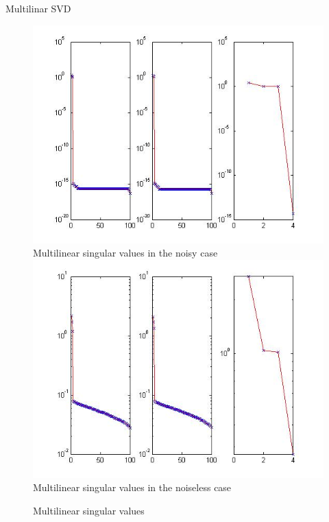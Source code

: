 \documentclass[t,12pt,english
\ifx\beamermode\undefined\else,\beamermode\fi
]{beamer}
\begin{document}
\begin{frame}{Multilinar SVD}

\begin{figure}[!htbp]
%
\centering
\includegraphics[width=1\textwidth]{10.jpg}\\
\tiny{Multilinear singular values in the noisy case}\label{a11}
\endminipage\hfill
{}%
\centering
\includegraphics[width=1\textwidth]{9.jpg}\\
\tiny{Multilinear singular values in the noiseless case}\label{a12}
\endminipage\hfill
\caption{\tiny Multilinear singular values}
\end{figure}


\end{frame}
\end{document}
